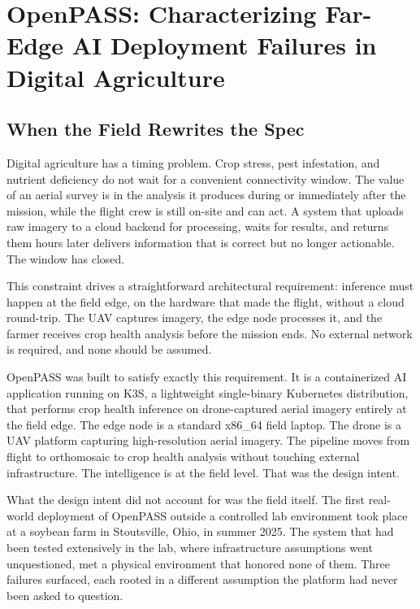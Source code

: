 
\chapter{OpenPASS: Characterizing Far-Edge AI Deployment Failures in Digital Agriculture}
\label{ch:openpass}

\section{When the Field Rewrites the Spec}
\label{sec:ch3_intro}
Digital agriculture has a timing problem. Crop stress, pest infestation, and nutrient deficiency do not wait for a convenient connectivity window. The value of an aerial survey is in the analysis it produces during or immediately after the mission, while the flight crew is still on-site and can act. A system that uploads raw imagery to a cloud backend for processing, waits for results, and returns them hours later delivers information that is correct but no longer actionable. The window has closed.

This constraint drives a straightforward architectural requirement: inference must happen at the field edge, on the hardware that made the flight, without a cloud round-trip. The UAV captures imagery, the edge node processes it, and the farmer receives crop health analysis before the mission ends. No external network is required, and none should be assumed.

OpenPASS was built to satisfy exactly this requirement. It is a containerized AI application running on K3S, a lightweight single-binary Kubernetes distribution, that performs crop health inference on drone-captured aerial imagery entirely at the field edge. The edge node is a standard x86\_64 field laptop. The drone is a UAV platform capturing high-resolution aerial imagery. The pipeline moves from flight to orthomosaic to crop health analysis without touching external infrastructure. The intelligence is at the field level. That was the design intent.

What the design intent did not account for was the field itself. The first real-world deployment of OpenPASS outside a controlled lab environment took place at a soybean farm in Stoutsville, Ohio, in summer 2025. The system that had been tested extensively in the lab, where infrastructure assumptions went unquestioned, met a physical environment that honored none of them. Three failures surfaced, each rooted in a different assumption the platform had never been asked to question.

